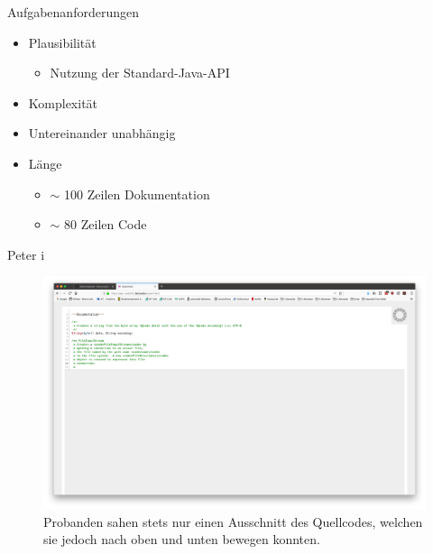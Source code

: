 \documentclass[10pt]{beamer}
\begin{document}
	\begin{frame}{Aufgabenanforderungen}
		\begin{itemize}
			\item Plausibilität\\
				\begin{itemize}
					\item Nutzung der Standard-Java-API
				\end{itemize}
			\vspace{\baselineskip}
			\item Komplexität\\
			\vspace{\baselineskip}
			\item Untereinander unabhängig\\
            \vspace{\baselineskip}
			\item Länge
			\begin{itemize}
				\item $\sim$ 100 Zeilen Dokumentation
				\item $\sim$ 80 Zeilen Code
			\end{itemize}
		\end{itemize}
	\end{frame}

	\begin{frame}{Peter  i}
		\begin{figure}
			\includegraphics[scale=0.15]{graphics/peter_window.png}
			\caption{\label{fig:peter_window.png} Probanden sahen stets nur einen Ausschnitt des Quellcodes, welchen sie jedoch nach oben und unten bewegen konnten.}
		\end{figure}
	\end{frame}
\end{document}
